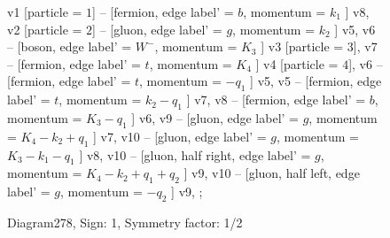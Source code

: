 \documentclass{revtex4}
\begin{document}
\begin{figure}[!htb]
\begin{center}
{    %
v1 [particle = \(1\)] -- [fermion, edge label' = \(b\), momentum = \(k_{1}\) ] v8, 
v2 [particle = \(2\)] -- [gluon, edge label' = \(g\), momentum = \(k_{2}\) ] v5, 
v6 -- [boson, edge label' = \(W^{-}\), momentum = \(K_{3}\) ] v3 [particle = \(3\)], 
v7 -- [fermion, edge label' = \(t\), momentum = \(K_{4}\) ] v4 [particle = \(4\)], 
v6 -- [fermion, edge label' = \(t\), momentum = \(-q_{1}\) ] v5, 
v5 -- [fermion, edge label' = \(t\), momentum = \(k_{2} - q_{1}\) ] v7, 
v8 -- [fermion, edge label' = \(b\), momentum = \(K_{3} - q_{1}\) ] v6, 
v9 -- [gluon, edge label' = \(g\), momentum = \(K_{4} - k_{2} + q_{1}\) ] v7, 
v10 -- [gluon, edge label' = \(g\), momentum = \(K_{3} - k_{1} - q_{1}\) ] v8, 
v10 -- [gluon, half right, edge label' = \(g\), momentum = \(K_{4} - k_{2} + q_{1} + q_{2}\) ] v9, 
v10 -- [gluon, half left, edge label' = \(g\), momentum = \(-q_{2}\) ] v9, 
};
\end{center}
\caption{Diagram278, Sign: 1, Symmetry factor: 1/2}
\end{figure}
\newpage
\end{document}
